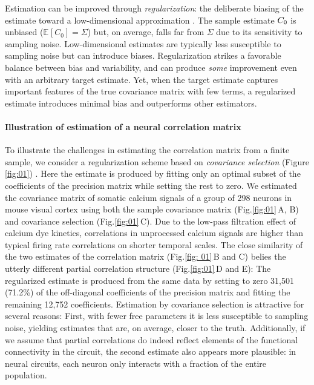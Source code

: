 \documentclass[10pt]{article}
\newcommand{\figref}[2]{Fig.\;\ref{fig:#1}\,#2}
\newcommand{\E}[2][]{\mathbb E_{#1}\left[ #2\right]}    %
\begin{document}
Estimation can be improved through \emph{regularization}: the deliberate biasing of the estimate toward a low-dimensional approximation \cite{Schafer:2005,Bickel:2006}.  The sample estimate $C_{\sf 0}$ is unbiased ($\E{C_0}=\Sigma$) but, on average, falls far from $\Sigma$ due to its sensitivity to sampling noise.  Low-dimensional estimates are typically less susceptible to sampling noise but can introduce biases.  Regularization strikes a favorable balance between bias and variability, and can produce \emph{some} improvement even with an arbitrary target estimate. Yet, when the target estimate captures important features of the true covariance matrix with few terms, a regularized estimate introduces minimal bias and outperforms other estimators. 

\paragraph{Illustration of estimation of a neural correlation matrix}
To illustrate the challenges in estimating the correlation matrix from a finite sample, we consider a regularization scheme based on \emph{covariance selection} (Figure \ref{fig:01}) \cite{Dempster:1972}. Here the estimate is produced by fitting only an optimal subset of the coefficients of the precision matrix while setting the rest to zero. We estimated the covariance matrix of somatic calcium signals of a group of 298 neurons in mouse visual cortex using both the sample covariance matrix (\figref{01}{A, B}) and covariance selection (\figref{01}{C}). Due to the low-pass filtration effect of calcium dye kinetics, correlations in unprocessed calcium signals are higher than typical firing rate correlations on shorter temporal scales. The close similarity of the two estimates of the correlation matrix (\figref{ 01}{B and C}) belies the utterly different partial correlation structure (\figref{01}{D and E}): The regularized estimate is produced from the same data by setting to zero 31,501 (71.2\%) of the off-diagonal coefficients of the precision matrix and fitting the remaining 12,752 coefficients. Estimation by covariance selection is attractive for several reasons: First, with fewer free parameters it is less susceptible to sampling noise, yielding estimates that are, on average, closer to the truth. Additionally, if we assume that partial correlations do indeed reflect elements of the functional connectivity in the circuit, the second estimate also appears more plausible: in neural circuits, each neuron only interacts with a fraction of the entire population.
\end{document}
